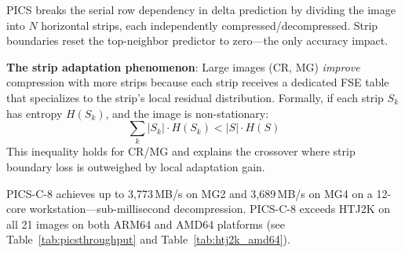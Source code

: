 \documentclass[10pt,twocolumn]{article}
\begin{document}
PICS breaks the serial row dependency in delta prediction by dividing the image into $N$ horizontal strips, each independently compressed/decompressed. Strip boundaries reset the top-neighbor predictor to zero---the only accuracy impact.

\textbf{The strip adaptation phenomenon}: Large images (CR, MG) \emph{improve} compression with more strips because each strip receives a dedicated FSE table that specializes to the strip's local residual distribution. Formally, if each strip $S_k$ has entropy $H(S_k)$, and the image is non-stationary:
\begin{equation}
  \sum_k |S_k| \cdot H(S_k) < |S| \cdot H(S)
\end{equation}
This inequality holds for CR/MG and explains the crossover where strip boundary loss is outweighed by local adaptation gain.

PICS-C-8 achieves up to 3,773\,MB/s on MG2 and 3,689\,MB/s on MG4 on a 12-core workstation---sub-millisecond decompression. PICS-C-8 exceeds HTJ2K on all 21 images on both ARM64 and AMD64 platforms (see Table~\ref{tab:picsthroughput} and Table~\ref{tab:htj2k_amd64}).
\end{document}
